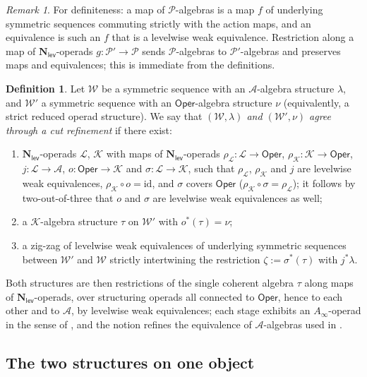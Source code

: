 \documentclass[12pt]{amsart}
\theoremstyle{definition}
\newtheorem{definition}[subsection]{Definition}
\theoremstyle{remark}
\newtheorem{remark}[subsection]{Remark}
\newcommand{\Oper}{\mathsf{Oper}}
\newcommand{\id}{\mathrm{id}}
\newcommand{\Cal}[1]{\mathcal{#1}}
\newcommand{\Nl}{\mathbf{N}_{\mathsf{lev}}}
\newcommand{\Kop}{\mathcal{K}}                   %
\newcommand{\Lop}{\mathcal{L}}                   %
\newcommand{\Aop}{\mathcal{A}}                   %
\begin{document}
\begin{remark}\label{rem:morphism-convention}
For definiteness: a map of $\Cal{P}$-algebras is a map $f$ of underlying symmetric sequences commuting strictly with the action maps, and an equivalence is such an $f$ that is a levelwise weak equivalence. Restriction along a map of $\Nl$-operads $g\colon \Cal{P}'\to \Cal{P}$ sends $\Cal{P}$-algebras to $\Cal{P}'$-algebras and preserves maps and equivalences; this is immediate from the definitions.
\end{remark}

\begin{definition}\label{def:structures-agree}
Let $\Cal{W}$ be a symmetric sequence with an $\Aop$-algebra structure $\lambda$, and $\Cal{W}'$ a symmetric sequence with an $\Oper$-algebra structure $\nu$ (equivalently, a strict reduced operad structure). We say that \emph{$(\Cal{W},\lambda)$ and $(\Cal{W}',\nu)$ agree through a cut refinement} if there exist:
\begin{enumerate}[label=(\roman*)]
    \item $\Nl$-operads $\Lop$, $\Kop$ with maps of $\Nl$-operads $\rho_\Lop\colon\Lop\to\Oper$, $\rho_\Kop\colon\Kop\to\Oper$, $j\colon \Lop\to \Aop$, $o\colon \Oper\to \Kop$ and $\sigma\colon\Lop\to\Kop$, such that $\rho_\Lop$, $\rho_\Kop$ and $j$ are levelwise weak equivalences, $\rho_\Kop\circ o = \id$, and $\sigma$ covers $\Oper$ ($\rho_\Kop\circ\sigma = \rho_\Lop$); it follows by two-out-of-three that $o$ and $\sigma$ are levelwise weak equivalences as well;
    \item a $\Kop$-algebra structure $\tau$ on $\Cal{W}'$ with $o^{*}(\tau) = \nu$;
    \item a zig-zag of levelwise weak equivalences of underlying symmetric sequences between $\Cal{W}'$ and $\Cal{W}$ strictly intertwining the restriction $\zeta := \sigma^{*}(\tau)$ with $j^{*}\lambda$.
\end{enumerate}
Both structures are then restrictions of the single coherent algebra $\tau$ along maps of $\Nl$-operads, over structuring operads all connected to $\Oper$, hence to each other and to $\Aop$, by levelwise weak equivalences; each stage exhibits an $A_\infty$-operad in the sense of \cite[Definition 6.38]{Clark-1}, and the notion refines the equivalence of $\Aop$-algebras used in \cite[\S 8.2]{Clark-1}.
\end{definition}

\subsection{The two structures on one object}\label{sec:twostructures}
\end{document}
